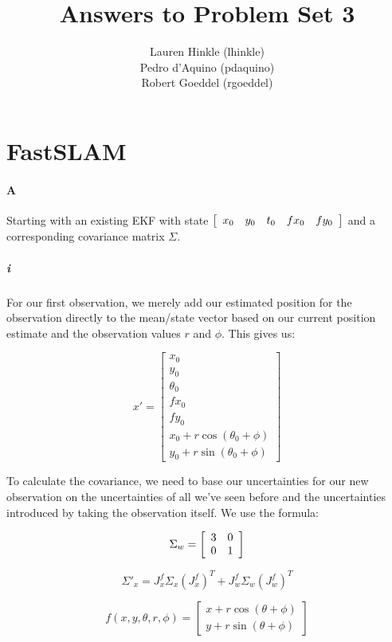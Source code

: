 \documentclass[12pt]{article}
\title{Answers to Problem Set 3}
\author{
	Lauren Hinkle (lhinkle)\\
	Pedro d'Aquino (pdaquino)\\
	Robert Goeddel (rgoeddel)}
\begin{document}
\maketitle
\pagebreak

\section{FastSLAM}

\paragraph{A}
Starting with an existing EKF with state $\left[\begin{array}{c c c c c}x_0 & y_0 & t_0 & fx_0 & fy_0\end{array}\right]$ and a corresponding covariance matrix $\Sigma$.
\subparagraph{i}
For our first observation, we merely add our estimated position for the observation
directly to the mean/state vector based on our current position estimate and the
observation values $r$ and $\phi$. This gives us:

$$x' = \left[\begin{array}{c}x_0 \\
        y_0 \\
        \theta_0 \\
        fx_0 \\
        fy_0 \\
        x_0 + r \cos (\theta_0 + \phi) \\
        y_0 + r \sin (\theta_0 + \phi)
        \end{array}\right]
$$

To calculate the covariance, we need to base our uncertainties for our new observation
on the uncertainties of all we've seen before and the uncertainties introduced by taking
the observation itself. We use the formula:

$$\Sigma_w = \left[\begin{array}{c c}
    3 & 0 \\
    0 & 1 \end{array}\right]
$$

$$\Sigma'_x = J^f_x \Sigma_x (J^f_x)^T + J^f_w \Sigma_w (J^f_w)^T$$

$$f(x, y, \theta, r, \phi) = \left[\begin{array}{c}
    x + r\cos(\theta+\phi) \\
    y + r\sin(\theta+\phi) \end{array}\right]$$
    
\end{document}
